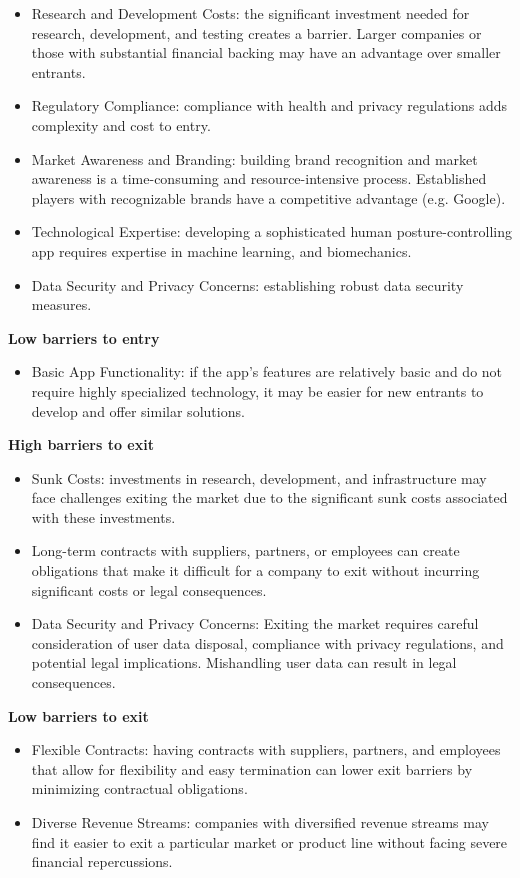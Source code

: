 \begin{itemize}
    \item Research and Development Costs: the significant investment needed for research, development, and testing creates a barrier. Larger companies or those with substantial financial backing may have an advantage over smaller entrants.
    \item Regulatory Compliance: compliance with health and privacy regulations adds complexity and cost to entry. 
    \item Market Awareness and Branding: building brand recognition and market awareness is a time-consuming and resource-intensive process. Established players with recognizable brands have a competitive advantage (e.g. Google).
    \item Technological Expertise: developing a sophisticated human posture-controlling app requires expertise in machine learning, and biomechanics. 
    \item Data Security and Privacy Concerns: establishing robust data security measures. 
\end{itemize}

\textbf{Low barriers to entry}
\begin{itemize}
\item Basic App Functionality: if the app's features are relatively basic and do not require highly specialized technology, it may be easier for new entrants to develop and offer similar solutions.
\end{itemize}

\textbf{High barriers to exit}
\begin{itemize}
\item Sunk Costs: investments in research, development, and infrastructure may face challenges exiting the market due to the significant sunk costs associated with these investments.
\item Long-term contracts with suppliers, partners, or employees can create obligations that make it difficult for a company to exit without incurring significant costs or legal consequences.
\item Data Security and Privacy Concerns: Exiting the market requires careful consideration of user data disposal, compliance with privacy regulations, and potential legal implications. Mishandling user data can result in legal consequences.
\end{itemize}

\textbf{Low barriers to exit}
\begin{itemize}
\item Flexible Contracts: having contracts with suppliers, partners, and employees that allow for flexibility and easy termination can lower exit barriers by minimizing contractual obligations.
\item Diverse Revenue Streams: companies with diversified revenue streams may find it easier to exit a particular market or product line without facing severe financial repercussions.
\end{itemize}


